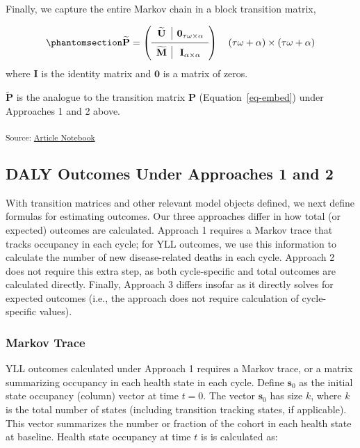 \documentclass[
]{agujournal2019}
\begin{document}
Finally, we capture the entire Markov chain in a block transition
matrix,

\begin{equation}\phantomsection\label{eq-Ptilde}{
\widetilde{\mathbf{P}}=\left(\begin{array}{c|c}
\widetilde{\mathbf{U}} & \mathbf{0}_{\tau \omega \times \alpha} \\
\hline \widetilde{\mathbf{M}} & \mathbf{I}_{\alpha \times \alpha}
\end{array}\right) \quad(\tau \omega+\alpha) \times(\tau \omega+\alpha)
}\end{equation} where \(\mathbf{I}\) is the identity matrix and
\(\mathbf{0}\) is a matrix of zeros.

\(\widetilde{\mathbf{P}}\) is the analogue to the transition matrix
\(\mathbf{P}\) (Equation~\ref{eq-embed}) under Approaches 1 and 2 above.

\textsubscript{Source:
\href{https://graveja0.github.io/dalys/index.qmd.html}{Article
Notebook}}

\subsection{DALY Outcomes Under Approaches 1 and 2}\label{sec-outcomes}

With transition matrices and other relevant model objects defined, we
next define formulas for estimating outcomes. Our three approaches
differ in how total (or expected) outcomes are calculated. Approach 1
requires a Markov trace that tracks occupancy in each cycle; for YLL
outcomes, we use this information to calculate the number of new
disease-related deaths in each cycle. Approach 2 does not require this
extra step, as both cycle-specific and total outcomes are calculated
directly. Finally, Approach 3 differs insofar as it directly solves for
expected outcomes (i.e., the approach does not require calculation of
cycle-specific values).

\subsubsection{Markov Trace}\label{markov-trace}

YLL outcomes calculated under Approach 1 requires a Markov trace, or a
matrix summarizing occupancy in each health state in each cycle. Define
\(\mathbf{s}_0\) as the initial state occupancy (column) vector at time
\(t=0\). The vector \(\mathbf{s}_0\) has size \(k\), where \(k\) is the
total number of states (including transition tracking states, if
applicable). This vector summarizes the number or fraction of the cohort
in each health state at baseline. Health state occupancy at time \(t\)
is is calculated as:
\end{document}
